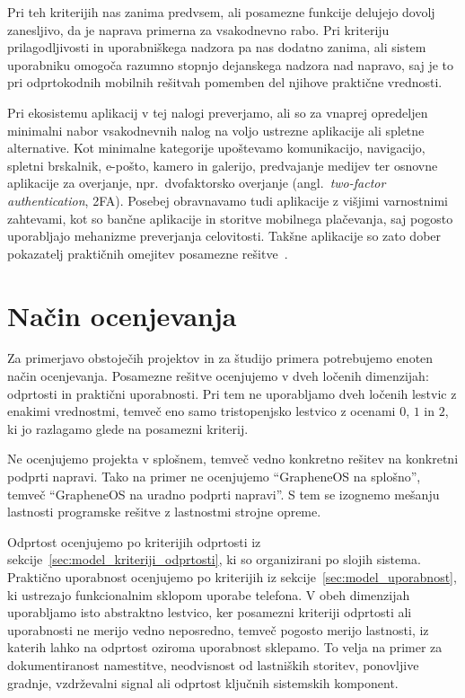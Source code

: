 \documentclass[a4paper,12pt,openright]{book}
\begin{document}
Pri teh kriterijih nas zanima predvsem, ali posamezne funkcije delujejo dovolj zanesljivo, da je naprava primerna za vsakodnevno rabo.
Pri kriteriju prilagodljivosti in uporabniškega nadzora pa nas dodatno zanima, ali sistem uporabniku omogoča razumno stopnjo dejanskega nadzora nad napravo, saj je to pri odprtokodnih mobilnih rešitvah pomemben del njihove praktične vrednosti.

Pri ekosistemu aplikacij v tej nalogi preverjamo, ali so za vnaprej opredeljen minimalni nabor vsakodnevnih nalog na voljo ustrezne aplikacije ali spletne alternative.
Kot minimalne kategorije upoštevamo komunikacijo, navigacijo, spletni brskalnik, e-pošto, kamero in galerijo, predvajanje medijev ter osnovne aplikacije za overjanje, npr.~dvofaktorsko overjanje (angl.~\textit{two-factor authentication}, 2FA).
Posebej obravnavamo tudi aplikacije z višjimi varnostnimi zahtevami, kot so bančne aplikacije in storitve mobilnega plačevanja, saj pogosto uporabljajo mehanizme preverjanja celovitosti.
Takšne aplikacije so zato dober pokazatelj praktičnih omejitev posamezne rešitve~\cite{play_integrity_overview}.

\section{Način ocenjevanja}
\label{sec:model_ocenjevanje}

Za primerjavo obstoječih projektov in za študijo primera potrebujemo enoten način ocenjevanja.
Posamezne rešitve ocenjujemo v dveh ločenih dimenzijah: odprtosti in praktični uporabnosti.
Pri tem ne uporabljamo dveh ločenih lestvic z enakimi vrednostmi, temveč eno samo tristopenjsko lestvico z ocenami $0$, $1$ in $2$, ki jo razlagamo glede na posamezni kriterij.

Ne ocenjujemo projekta v splošnem, temveč vedno konkretno rešitev na konkretni podprti napravi.
Tako na primer ne ocenjujemo \enquote{GrapheneOS na splošno}, temveč \enquote{GrapheneOS na uradno podprti napravi}.
S tem se izognemo mešanju lastnosti programske rešitve z lastnostmi strojne opreme.

Odprtost ocenjujemo po kriterijih odprtosti iz sekcije~\ref{sec:model_kriteriji_odprtosti}, ki so organizirani po slojih sistema.
Praktično uporabnost ocenjujemo po kriterijih iz sekcije~\ref{sec:model_uporabnost}, ki ustrezajo funkcionalnim sklopom uporabe telefona.
V obeh dimenzijah uporabljamo isto abstraktno lestvico, ker posamezni kriteriji odprtosti ali uporabnosti ne merijo vedno neposredno, temveč pogosto merijo lastnosti, iz katerih lahko na odprtost oziroma uporabnost sklepamo.
To velja na primer za dokumentiranost namestitve, neodvisnost od lastniških storitev, ponovljive gradnje, vzdrževalni signal ali odprtost ključnih sistemskih komponent.
\end{document}
